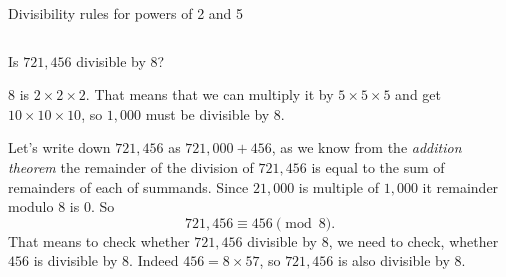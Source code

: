 \documentclass[9pt,aspectratio=169]{beamer}
\begin{document}
\begin{frame}{Divisibility rules for powers of 2 and 5}
  \begin{columns}[T]
    \begin{column}{0.5\textwidth}
      \begin{problem}
        Is $721{,}456$ divisible by $8$?
      \end{problem}
      $8$ is $2 \times 2 \times 2$. That means that we can multiply it by $5 \times 5 \times 5$ and get $10 \times 10 \times 10$, so $1,000$ must be divisible by $8$.

      Let's write down $721{,}456$ as $721{,}000 + 456$, as we know from the \emph{addition theorem} the remainder of the division of $721{,}456$ is equal to the sum of remainders of each of summands. Since $21{,}000$ is multiple of $1{,}000$ it remainder modulo $8$ is $0$. So 
      \[ 721{,}456 \equiv 456 \pmod{8}. \]
      That means to check whether $721{,}456$ divisible by $8$, we need to check, whether $456$ is divisible by $8$. Indeed $456 = 8 \times 57$, so $721{,}456$ is also divisible by $8$.\medskip
      

\end{column}
\end{columns}
\end{frame}
\end{document}
